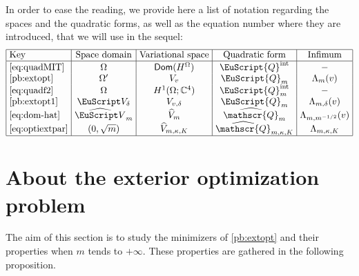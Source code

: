 \documentclass[10pt]{amsart}
\let\mathcal \EuScript
\newcommand{\scrQ}{\mathscr{Q}}
\newcommand{\cQ}{\mathcal{Q}}
\newcommand{\intt}{\mathrm{int}}
\theoremstyle{plain}
\theoremstyle{definition}
\newcommand{\CC}{\mathbb{C}}
\DeclareMathOperator{\Dom}{\mathsf{Dom}}
\begin{document}
In order to ease the reading, we provide here a list of notation regarding the spaces and the quadratic forms, as well as the equation number where they are introduced, that we will use in the sequel:
\[\arraycolsep3.5pt
\begin{array}{|l|c|c|c|c|}
\hline
\mbox{Key}&\mbox{Space domain} &\mbox{Variational space}& \mbox{Quadratic form}&\mbox{Infimum}\\
\hline
\mbox{\eqref{eq:quadMIT}}&\Omega &\Dom(H^\Omega)&\cQ^\intt&-\\
\mbox{\eqref{pb:extopt}}&\Omega' &V_v&\cQ_m&\Lambda_m(v)\\
\mbox{\eqref{eq:quadf2}}&\Omega &H^1(\Omega; \CC^4)&\cQ_m^\intt&-\\
\mbox{\eqref{pb:extopt1}}&\mathcal V_{\delta} &V_{v,\delta}& \cQ_{m}& \Lambda_{m,\delta}(v)\\
\mbox{\eqref{eq:dom-hat}}&\widehat{\mathcal V}_{m} &\widehat V_{m} &\widehat{\scrQ}_{m}&\Lambda_{m,m^{-1/2}}(v)\\
\mbox{\eqref{eq:optiextpar}}&(0,\sqrt{m}) & \widehat{V}_{m,\kappa,K} & \widehat{\scrQ}_{m,\kappa,K}& \Lambda_{m,\kappa,K} \\
\hline
\end{array}
\]

\section{About the exterior optimization problem}\label{sec.2}
The aim of this section is to study the minimizers of \eqref{pb:extopt} and their properties when $m$ tends to $+\infty$. These properties are gathered in the following proposition.
\end{document}
